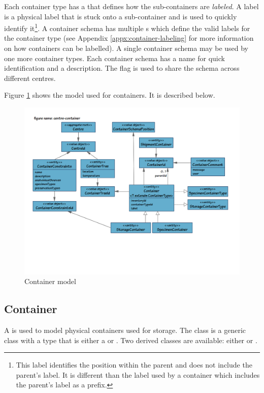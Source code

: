 Each container type has a  that defines how the
sub-containers are \emph{labeled}. A label is a physical label that is stuck
onto a sub-container and is used to quickly identify it\footnote{This label
  identifies the position within the parent and does not include the parent's
  label. It is different than the label used by a container which includes the
  parent's label as a prefix.}. A container schema has multiple
s which define the valid labels for the
container type (see Appendix \ref{appx:container-labeling} for more information
on how containers can be labelled). A single container schema may be used by
one more container types. Each container schema has a name for quick
identification and a description. The  flag is used to share
the schema across different centres.

Figure \ref{fig:centre-container} shows the model used for containers. It is
described below.

\begin{figure}[H]
  \centering
  \includegraphics[trim={10mm 52mm 14mm 18mm}, clip,
    width=1\textwidth]{images/centre-container}
  \caption{Container model}
  \label{fig:centre-container}
\end{figure}

\subsection*{Container}
A  is used to model physical containers used for
storage. The  class is a generic class with a type that
is either a  or
. Two derived classes are available: either
 or .

